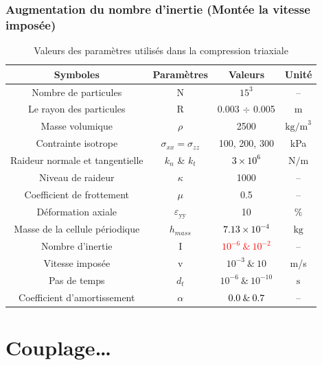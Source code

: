\documentclass[a4paper,12pt]{report}
\begin{document}
\subsubsection{Augmentation du nombre d'inertie (Montée la vitesse imposée)}
    \begin{table}
    \centering
    \begin{table}
    \centering
    \begin{tabular}{|c|c|c|c|}
    \hline
    \textbf{Symboles} & \textbf{Paramètres} & \textbf{Valeurs} & \textbf{Unité} \\ 
    \hline
    Nombre de particules & N & $15^3$ & -- \\  
    \hline
    Le rayon des particules & R & 0.003 $\div$ 0.005 & m \\  
    \hline
    Masse volumique & $\rho$  & 2500 & $\text{kg/m}^3$ \\
    \hline
    Contrainte isotrope & $\sigma_{xx} = \sigma_{zz}$ & 100, 200, 300 & kPa \\ 
    \hline
    Raideur normale et tangentielle & $k_n$ \& $k_t$ & \textcolor{black}{$3 \times 10^6$} & $\text{N/m}$ \\ 
    \hline
    Niveau de raideur & $\kappa$ & 1000 & -- \\ 
    \hline
    Coefficient de frottement & $\mu$ & 0.5 & -- \\ 
    \hline
    Déformation axiale & $\varepsilon_{\text{yy}}$ &  10 & $\%$ \\ 
    \hline
    Masse de la cellule périodique  & $h_{mass}$ &   \textcolor{black}{$7.13 \times 10^{-4}$}  & $\text{kg}$ \\ 
    \hline
    Nombre d’inertie & I & \textcolor{red}{$10^{-6}\  \& \ 10^{-2}$} & -- \\ 
    \hline
    Vitesse imposée & v & $10^{-3}\  \& \ 10 $ & m/s \\ 
    \hline
    Pas de temps & $d_t$  & $10^{-6}\  \& \ 10^{-10}$ & $\text{s}$\\
    \hline
    Coefficient d'amortissement & $\alpha$  & \textcolor{black}{$0.0 \ \& \ 0.7$} & --\\
    \hline
    \end{tabular}
    \caption{Valeurs des paramètres utilisés dans la compression triaxiale}
    \end{table}

\section{Couplage\ldots}


\end{table}
\end{document}
